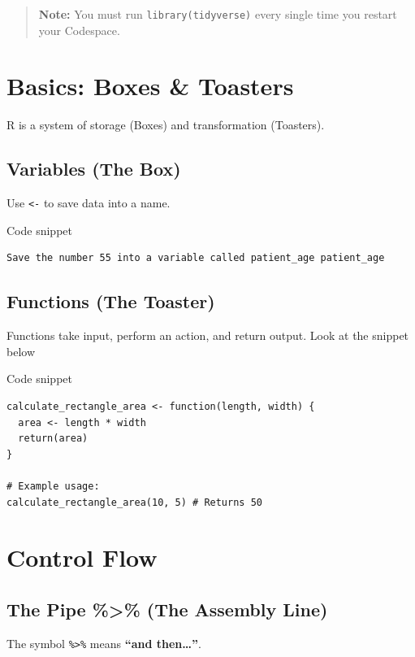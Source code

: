 \documentclass[
  letterpaper,
  DIV=11,
  numbers=noendperiod,
  oneside]{scrreprt}
\begin{document}
\begin{quote}
\textbf{Note:} You must run \texttt{library(tidyverse)} every single
time you restart your Codespace.
\end{quote}

\chapter{Basics: Boxes \& Toasters}\label{basics-boxes-toasters}

R is a system of storage (Boxes) and transformation (Toasters).

\section{Variables (The Box)}\label{variables-the-box}

Use \texttt{\textless{}-} to save data into a name.

Code snippet

\begin{verbatim}
Save the number 55 into a variable called patient_age patient_age
\end{verbatim}

\section{Functions (The Toaster)}\label{functions-the-toaster-1}

Functions take input, perform an action, and return output. Look at the
snippet below

Code snippet

\begin{verbatim}
calculate_rectangle_area <- function(length, width) {
  area <- length * width
  return(area)
}

# Example usage:
calculate_rectangle_area(10, 5) # Returns 50
\end{verbatim}

\chapter{Control Flow}\label{control-flow}

\section{The Pipe \%\textgreater\% (The Assembly
Line)}\label{the-pipe-the-assembly-line-1}

The symbol \texttt{\%\textgreater{}\%} means \textbf{``and
then\ldots{}''}.
\end{document}
